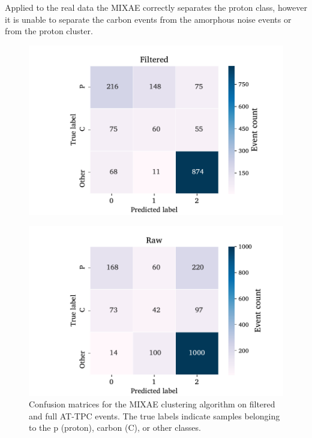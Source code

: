 \documentclass[review,number,sort&compress]{elsarticle}
\begin{document}
Applied to the real data the MIXAE correctly separates the proton class, however it is unable to separate the carbon events from the amorphous noise events or from the proton cluster. 

\begin{figure}[H]
\centering

	\includegraphics[width=\textwidth]{custom_work/Filtered_mixae_conf_mat.pdf}

\end{figure}
\begin{figure}[H]
\centering


	\includegraphics[width=\textwidth]{custom_work/Raw_mixae_conf_mat.pdf}

\caption[MIXAE - confusion matrices]{Confusion matrices for the MIXAE clustering algorithm on filtered and full AT-TPC events. The true labels indicate samples belonging to the p (proton), carbon (C), or other classes. }\label{fig:mixae_confmat}
\end{figure}
\end{document}

